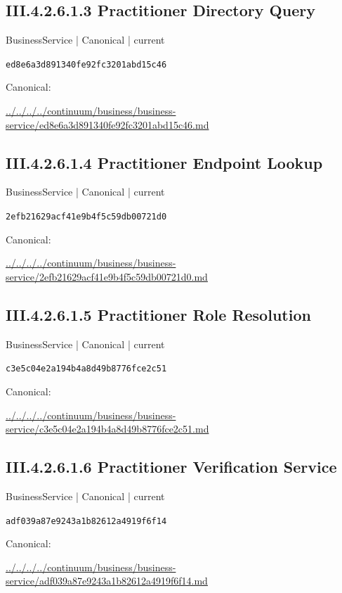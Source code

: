 \documentclass[10pt,a4paper]{article}
\begin{document}
\subsection*{III.4.2.6.1.3 Practitioner Directory Query}
\label{element-ed8e6a3d891340fe92fc3201abd15c46}
{\small BusinessService | Canonical | current}\par
\texttt{ed8e6a3d891340fe92fc3201abd15c46}\par
Canonical: \par
{\footnotesize\url{../../../../continuum/business/business-service/ed8e6a3d891340fe92fc3201abd15c46.md}}\par
\subsection*{III.4.2.6.1.4 Practitioner Endpoint Lookup}
\label{element-2efb21629acf41e9b4f5c59db00721d0}
{\small BusinessService | Canonical | current}\par
\texttt{2efb21629acf41e9b4f5c59db00721d0}\par
Canonical: \par
{\footnotesize\url{../../../../continuum/business/business-service/2efb21629acf41e9b4f5c59db00721d0.md}}\par
\subsection*{III.4.2.6.1.5 Practitioner Role Resolution}
\label{element-c3e5c04e2a194b4a8d49b8776fce2c51}
{\small BusinessService | Canonical | current}\par
\texttt{c3e5c04e2a194b4a8d49b8776fce2c51}\par
Canonical: \par
{\footnotesize\url{../../../../continuum/business/business-service/c3e5c04e2a194b4a8d49b8776fce2c51.md}}\par
\subsection*{III.4.2.6.1.6 Practitioner Verification Service}
\label{element-adf039a87e9243a1b82612a4919f6f14}
{\small BusinessService | Canonical | current}\par
\texttt{adf039a87e9243a1b82612a4919f6f14}\par
Canonical: \par
{\footnotesize\url{../../../../continuum/business/business-service/adf039a87e9243a1b82612a4919f6f14.md}}\par
\end{document}
